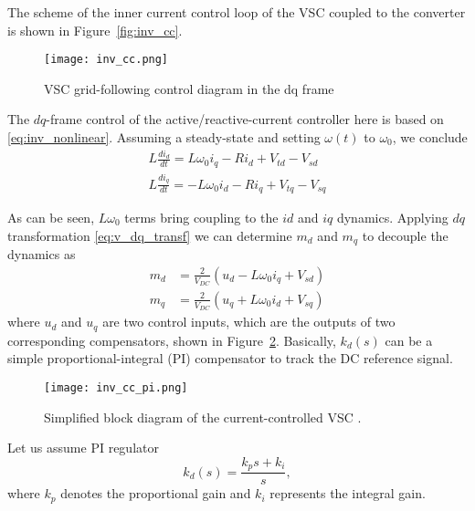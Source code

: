 The scheme of the inner current control loop of the VSC coupled to the converter is shown in Figure~\cref{fig:inv_cc}.

\begin{figure}[htbp]
    \centering
    \texttt{[image: inv\_cc.png]}
    \caption{VSC grid-following control diagram in the dq frame}
    \label{fig:inv_diagram_gfl}
\end{figure}

The $dq$-frame control of the active/reactive-current controller here is based on \ref{eq:inv_nonlinear}. Assuming a steady-state and setting $\omega(t)$ to $\omega_0$, we conclude
\begin{equation}
    \begin{array}{l}
L \displaystyle\frac{d i_{d}}{d t}=L \omega_{0} i_{q}-R i_{d}+V_{t d}-V_{s d} \\[1em]
L \displaystyle\frac{d i_{q}}{d t}=-L \omega_{0} i_{d}-R i_{q}+V_{t q}-V_{s q}
\end{array}
\end{equation}

As can be seen, $L\omega_0$ terms bring coupling to the $id$ and $iq$ dynamics. Applying $dq$ transformation \ref{eq:v_dq_transf} we can determine $m_d$ and $m_q$ to decouple the dynamics as 
\begin{equation}
    \begin{aligned}
m_{d} & =\frac{2}{V_{D C}}\left(u_{d}-L \omega_{0} i_{q}+V_{s d}\right) \\
m_{q} & =\frac{2}{V_{D C}}\left(u_{q}+L \omega_{0} i_{d}+V_{s q}\right)
\end{aligned}
\end{equation}
where $u_d$ and $u_q$ are two control inputs, which are the outputs of two corresponding compensators, shown in Figure~\cref{fig:inv_cc_pi}. Basically, $k_d(s)$ can be a simple proportional-integral (PI) compensator to track the DC reference signal.

\begin{figure}[htbp]
    \centering
    \texttt{[image: inv\_cc\_pi.png]}
    \caption{Simplified block diagram of the current-controlled VSC \autocite{book_yazdani_2010}.}
    \label{fig:inv_cc_pi}
\end{figure}

Let us assume PI regulator
\begin{equation}
    k_{d}(s)=\frac{k_{p} s+k_{i}}{s},
\end{equation}
where $k_p$ denotes the proportional gain and $k_i$ represents the integral gain. 

